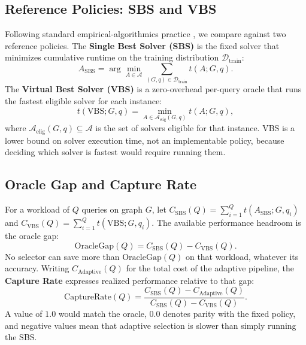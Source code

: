 \documentclass[conference]{IEEEtran}
\begin{document}
\subsection{Reference Policies: SBS and VBS}
Following standard empirical-algorithmics practice \cite{bischl2016}, we compare against two reference policies. The \textbf{Single Best Solver (SBS)} is the fixed solver that minimizes cumulative runtime on the training distribution $\mathcal{D}_{\mathrm{train}}$:
\begin{equation}
A_{\mathrm{SBS}} = \arg\min_{A \in \mathcal{A}} \sum_{(G,q) \in \mathcal{D}_{\mathrm{train}}} t(A;G,q).
\end{equation}
The \textbf{Virtual Best Solver (VBS)} is a zero-overhead per-query oracle that runs the fastest eligible solver for each instance:
\begin{equation}
t(\mathrm{VBS};G,q) = \min_{A \in \mathcal{A}_{\mathrm{elig}}(G,q)} t(A;G,q),
\end{equation}
where $\mathcal{A}_{\mathrm{elig}}(G,q) \subseteq \mathcal{A}$ is the set of solvers eligible for that instance. VBS is a lower bound on solver execution time, not an implementable policy, because deciding which solver is fastest would require running them.

\subsection{Oracle Gap and Capture Rate}
For a workload of $Q$ queries on graph $G$, let $C_{\mathrm{SBS}}(Q)=\sum_{i=1}^{Q} t(A_{\mathrm{SBS}};G,q_i)$ and $C_{\mathrm{VBS}}(Q)=\sum_{i=1}^{Q} t(\mathrm{VBS};G,q_i)$. The available performance headroom is the oracle gap:
\begin{equation}
\mathrm{OracleGap}(Q) = C_{\mathrm{SBS}}(Q) - C_{\mathrm{VBS}}(Q).
\end{equation}
No selector can save more than $\mathrm{OracleGap}(Q)$ on that workload, whatever its accuracy. Writing $C_{\mathrm{Adaptive}}(Q)$ for the total cost of the adaptive pipeline, the \textbf{Capture Rate} expresses realized performance relative to that gap:
\begin{equation}
\mathrm{CaptureRate}(Q) = \frac{C_{\mathrm{SBS}}(Q) - C_{\mathrm{Adaptive}}(Q)}{C_{\mathrm{SBS}}(Q) - C_{\mathrm{VBS}}(Q)}.
\end{equation}
A value of $1.0$ would match the oracle, $0.0$ denotes parity with the fixed policy, and negative values mean that adaptive selection is slower than simply running the SBS.
\end{document}
